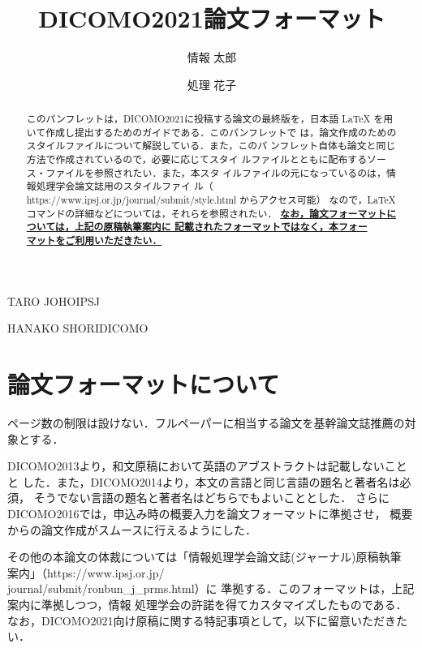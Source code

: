 \documentclass[Japanese]{dicomopapers}
\begin{document}
\title{DICOMO2021論文フォーマット}


\author{情報 太郎}{TARO JOHO}{IPSJ}
\author{処理 花子}{HANAKO SHORI}{DICOMO}

\begin{abstract}
  このパンフレットは，DICOMO2021に投稿する論文の最終版を，日本語
  {\LaTeX} を用いて作成し提出するためのガイドである．このパンフレットで
  は，論文作成のためのスタイルファイルについて解説している．また，このパ
  ンフレット自体も論文と同じ方法で作成されているので，必要に応じてスタイ
  ルファイルとともに配布するソース・ファイルを参照されたい．また，本スタ
  イルファイルの元になっているのは，情報処理学会論文誌用のスタイルファイ
  ル（ https://www.ipsj.or.jp/journal/submit/style.html からアクセス可能）
  なので，{\LaTeX}コマンドの詳細などについては，それらを参照されたい．
  \underline{\bf なお，論文フォーマットについては，上記の原稿執筆案内に
    記載されたフォーマットではなく，本フォー}\\
  \underline{\bf マットをご利用いただきたい．}

\end{abstract}

\maketitle

\section{論文フォーマットについて}
ページ数の制限は設けない．フルペーパーに相当する論文を基幹論文誌推薦の対象とする．

DICOMO2013より，和文原稿において英語のアブストラクトは記載しないことと
した．また，DICOMO2014より，本文の言語と同じ言語の題名と著者名は必須，
そうでない言語の題名と著者名はどちらでもよいこととした．
さらにDICOMO2016では，申込み時の概要入力を論文フォーマットに準拠させ，
概要からの論文作成がスムースに行えるようにした．

その他の本論文の体裁については「情報処理学会論文誌(ジャーナル)原稿執筆
案内」（https://www.ipsj.or.jp/\\journal/submit/ronbun\_j\_prms.html）に
準拠する\cite{webpage}．このフォーマットは，上記案内に準拠しつつ，情報
処理学会の許諾を得てカスタマイズしたものである．
なお，DICOMO2021向け原稿に関する特記事項として，以下に留意いただきたい．
\end{document}
